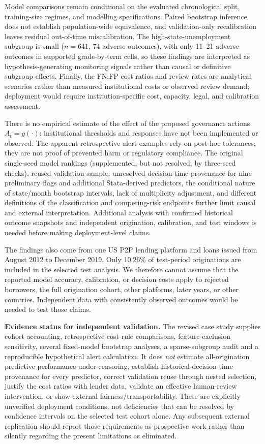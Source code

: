\documentclass[10pt]{article}
\begin{document}
Model comparisons remain conditional on the evaluated chronological split, training-size regimes, and modelling specifications. Paired bootstrap inference does not establish population-wide equivalence, and validation-only recalibration leaves residual out-of-time miscalibration. The high-state-unemployment subgroup is small ($n=641$, 74 adverse outcomes), with only 11--21 adverse outcomes in supported grade-by-term cells, so these findings are interpreted as hypothesis-generating monitoring signals rather than causal or definitive subgroup effects. Finally, the FN:FP cost ratios and review rates are analytical scenarios rather than measured institutional costs or observed review demand; deployment would require institution-specific cost, capacity, legal, and calibration assessment.

There is no empirical estimate of the effect of the proposed governance actions $A_t=g(\cdot)$: institutional thresholds and responses have not been implemented or observed. The apparent retrospective alert examples rely on post-hoc tolerances; they are not proof of prevented harm or regulatory compliance. The original single-seed model rankings (supplemented, but not resolved, by three-seed checks), reused validation sample, unresolved decision-time provenance for nine preliminary flags and additional Stata-derived predictors, the conditional nature of state/month bootstrap intervals, lack of multiplicity adjustment, and different definitions of the classification and competing-risk endpoints further limit causal and external interpretation. Additional analysis with confirmed historical outcome snapshots and independent origination, calibration, and test windows is needed before making deployment-level claims.

The findings also come from one US P2P lending platform and loans issued from August 2012 to December 2019. Only 10.26\% of test-period originations are included in the selected test analysis. We therefore cannot assume that the reported model accuracy, calibration, or decision costs apply to rejected borrowers, the full origination cohort, other platforms, later years, or other countries. Independent data with consistently observed outcomes would be needed to test those claims.

\noindent\textbf{Evidence status for independent validation.} The revised case study supplies cohort accounting, retrospective cost-rule comparisons, feature-exclusion sensitivity, several fixed-model bootstrap analyses, a sparse-subgroup audit and a reproducible hypothetical alert calculation. It does \emph{not} estimate all-origination predictive performance under censoring, establish historical decision-time provenance for every predictor, correct validation reuse through nested selection, justify the cost ratios with lender data, validate an effective human-review intervention, or show external fairness/transportability. These are explicitly unverified deployment conditions, not deficiencies that can be resolved by confidence intervals on the selected test cohort alone. Any subsequent external replication should report those requirements as prospective work rather than silently regarding the present limitations as eliminated.
\end{document}
